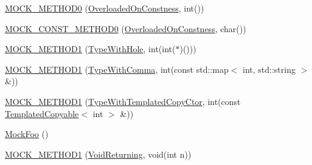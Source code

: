 \begin{DoxyCompactItemize}
\item 
\mbox{\hyperlink{classtesting_1_1gmock__generated__function__mockers__test_1_1_mock_foo_a291ff46b043d00d0f0acb081c5c36f2e}{M\+O\+C\+K\+\_\+\+M\+E\+T\+H\+O\+D0}} (\mbox{\hyperlink{classtesting_1_1gmock__generated__function__mockers__test_1_1_foo_interface_afbbe6ec72ae237de05e109dea5b03f4f}{Overloaded\+On\+Constness}}, int())
\item 
\mbox{\hyperlink{classtesting_1_1gmock__generated__function__mockers__test_1_1_mock_foo_aa0da575ad3061850662c5f401ddb30c2}{M\+O\+C\+K\+\_\+\+C\+O\+N\+S\+T\+\_\+\+M\+E\+T\+H\+O\+D0}} (\mbox{\hyperlink{classtesting_1_1gmock__generated__function__mockers__test_1_1_foo_interface_afbbe6ec72ae237de05e109dea5b03f4f}{Overloaded\+On\+Constness}}, char())
\item 
\mbox{\hyperlink{classtesting_1_1gmock__generated__function__mockers__test_1_1_mock_foo_a33077a71c1c5178c25b0a4aa099d5f2c}{M\+O\+C\+K\+\_\+\+M\+E\+T\+H\+O\+D1}} (\mbox{\hyperlink{classtesting_1_1gmock__generated__function__mockers__test_1_1_foo_interface_a9e92ef227dc68806f85ebff9c8a6102a}{Type\+With\+Hole}}, int(int($\ast$)()))
\item 
\mbox{\hyperlink{classtesting_1_1gmock__generated__function__mockers__test_1_1_mock_foo_a3774adcc0155dd4c3b5fd790a6f40261}{M\+O\+C\+K\+\_\+\+M\+E\+T\+H\+O\+D1}} (\mbox{\hyperlink{classtesting_1_1gmock__generated__function__mockers__test_1_1_foo_interface_a64544adcb9c502a8fbc3990b53f4c767}{Type\+With\+Comma}}, int(const std\+::map$<$ int, std\+::string $>$ \&))
\item 
\mbox{\hyperlink{classtesting_1_1gmock__generated__function__mockers__test_1_1_mock_foo_afabde8ab238dcae147e72b16c246416d}{M\+O\+C\+K\+\_\+\+M\+E\+T\+H\+O\+D1}} (\mbox{\hyperlink{classtesting_1_1gmock__generated__function__mockers__test_1_1_foo_interface_ac3f47b680d4a46f2a77ebd76b7243187}{Type\+With\+Templated\+Copy\+Ctor}}, int(const \mbox{\hyperlink{classtesting_1_1gmock__generated__function__mockers__test_1_1_templated_copyable}{Templated\+Copyable}}$<$ int $>$ \&))
\item 
\mbox{\hyperlink{classtesting_1_1gmock__generated__function__mockers__test_1_1_mock_foo_a05d4aeb00d75b5dbf627a5db2c0ada7f}{Mock\+Foo}} ()
\item 
\mbox{\hyperlink{classtesting_1_1gmock__generated__function__mockers__test_1_1_mock_foo_a03e7f723e9909b031fc6df22f41aac7f}{M\+O\+C\+K\+\_\+\+M\+E\+T\+H\+O\+D1}} (\mbox{\hyperlink{classtesting_1_1gmock__generated__function__mockers__test_1_1_foo_interface_adf968115cf1260004d8abe372dc71c85}{Void\+Returning}}, void(int n))

\end{DoxyCompactItemize}
